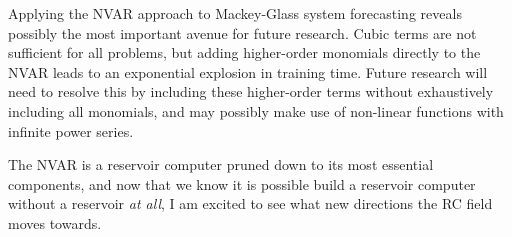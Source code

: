 Applying the NVAR approach to Mackey-Glass system forecasting reveals
possibly the most important avenue for future research. Cubic terms
are not sufficient for all problems, but adding higher-order monomials
directly to the NVAR leads to an exponential explosion in training
time. Future research will need to resolve this by including these
higher-order terms without exhaustively including all monomials, and
may possibly make use of non-linear functions with infinite power
series.

The NVAR is a reservoir computer pruned down to its most essential
components, and now that we know it is possible build a reservoir computer
without a reservoir \emph{at all}, I am excited to see what new
directions the RC field moves towards.
